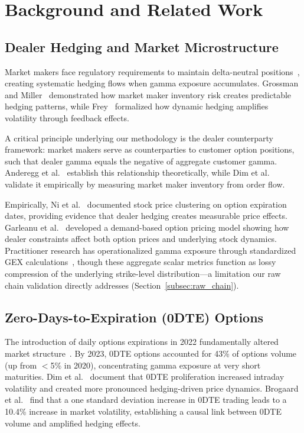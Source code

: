 \section{Background and Related Work}
\label{sec:related}

\subsection{Dealer Hedging and Market Microstructure}

Market makers face regulatory requirements to maintain delta-neutral positions~\cite{sec15c31,finra4210}, creating systematic hedging flows when gamma exposure accumulates. Grossman and Miller~\cite{grossman1988liquidity} demonstrated how market maker inventory risk creates predictable hedging patterns, while Frey~\cite{frey1997market} formalized how dynamic hedging amplifies volatility through feedback effects.

A critical principle underlying our methodology is the dealer counterparty framework: market makers serve as counterparties to customer option positions, such that dealer gamma equals the negative of aggregate customer gamma. Anderegg et al.~\cite{anderegg2022impact} establish this relationship theoretically, while Dim et al.~\cite{dim2025zero} validate it empirically by measuring market maker inventory from order flow.

Empirically, Ni et al.~\cite{ni2005stock} documented stock price clustering on option expiration dates, providing evidence that dealer hedging creates measurable price effects. Garleanu et al.~\cite{garleanu2009demand} developed a demand-based option pricing model showing how dealer constraints affect both option prices and underlying stock dynamics. Practitioner research has operationalized gamma exposure through standardized GEX calculations~\cite{spotgamma2021,squeezemetrics2020}, though these aggregate scalar metrics function as lossy compression of the underlying strike-level distribution---a limitation our raw chain validation directly addresses (Section~\ref{subsec:raw_chain}).

\subsection{Zero-Days-to-Expiration (0DTE) Options}

The introduction of daily options expirations in 2022 fundamentally altered market structure~\cite{cboe2024zero}. By 2023, 0DTE options accounted for 43\% of options volume (up from $<$5\% in 2020), concentrating gamma exposure at very short maturities. Dim et al.~\cite{dim2025zero} document that 0DTE proliferation increased intraday volatility and created more pronounced hedging-driven price dynamics. Brogaard et al.~\cite{brogaard2023does} find that a one standard deviation increase in 0DTE trading leads to a 10.4\% increase in market volatility, establishing a causal link between 0DTE volume and amplified hedging effects.

